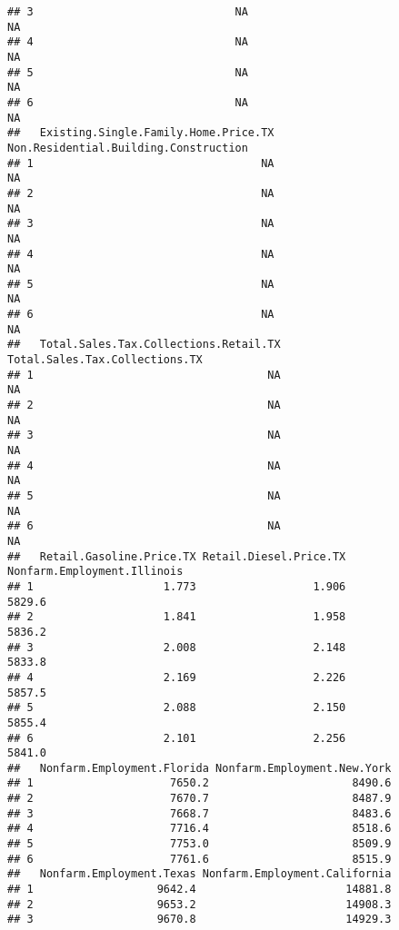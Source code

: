 \documentclass[
]{article}
\begin{document}
\begin{verbatim}
## 3                               NA                                   NA
## 4                               NA                                   NA
## 5                               NA                                   NA
## 6                               NA                                   NA
##   Existing.Single.Family.Home.Price.TX Non.Residential.Building.Construction
## 1                                   NA                                    NA
## 2                                   NA                                    NA
## 3                                   NA                                    NA
## 4                                   NA                                    NA
## 5                                   NA                                    NA
## 6                                   NA                                    NA
##   Total.Sales.Tax.Collections.Retail.TX Total.Sales.Tax.Collections.TX
## 1                                    NA                             NA
## 2                                    NA                             NA
## 3                                    NA                             NA
## 4                                    NA                             NA
## 5                                    NA                             NA
## 6                                    NA                             NA
##   Retail.Gasoline.Price.TX Retail.Diesel.Price.TX Nonfarm.Employment.Illinois
## 1                    1.773                  1.906                      5829.6
## 2                    1.841                  1.958                      5836.2
## 3                    2.008                  2.148                      5833.8
## 4                    2.169                  2.226                      5857.5
## 5                    2.088                  2.150                      5855.4
## 6                    2.101                  2.256                      5841.0
##   Nonfarm.Employment.Florida Nonfarm.Employment.New.York
## 1                     7650.2                      8490.6
## 2                     7670.7                      8487.9
## 3                     7668.7                      8483.6
## 4                     7716.4                      8518.6
## 5                     7753.0                      8509.9
## 6                     7761.6                      8515.9
##   Nonfarm.Employment.Texas Nonfarm.Employment.California
## 1                   9642.4                       14881.8
## 2                   9653.2                       14908.3
## 3                   9670.8                       14929.3

\end{verbatim}
\end{document}
